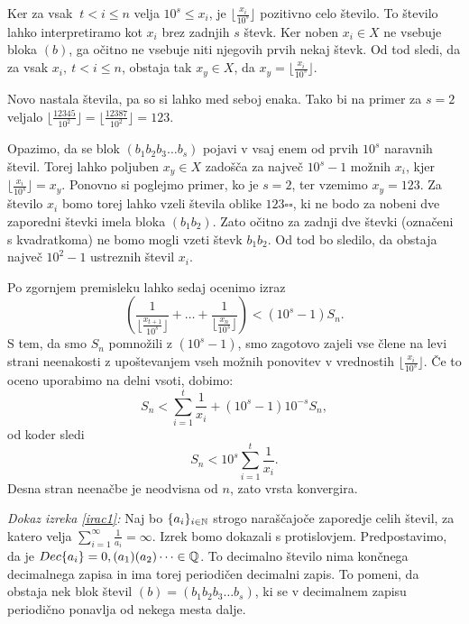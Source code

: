 \documentclass[twoside,11pt]{article}
\begin{document}
Ker za vsak $\ t < i \leq n$ velja $10^s \leq x_i$, je $\lfloor \frac{x_i}{10^s} \rfloor$ pozitivno celo število.
To število lahko interpretiramo kot $x_i$ brez zadnjih $s$ števk. 
Ker noben $x_i \in X$ ne vsebuje bloka $(b)$, 
ga očitno ne vsebuje niti njegovih prvih nekaj števk. 
Od tod sledi, da za vsak $x_i, \ t < i \leq n$, obstaja tak $x_y \in X$, da $ x_y = \lfloor \frac{x_i}{10^s} \rfloor$.

Novo nastala števila, pa so si lahko med seboj enaka. Tako bi na primer za $s=2$ veljalo 
$ \lfloor\frac{12345}{10^2}\rfloor = \lfloor \frac{12387}{10^2}\rfloor = 123$.

Opazimo, da se blok $(b_1b_2b_3 \dots b_s)$ pojavi v vsaj enem od prvih $10^s$ naravnih števil.
Torej lahko poljuben $x_y \in X$ zadošča za največ $10^s - 1$ možnih $x_i$, kjer $\lfloor \frac{x_i}{10^s} \rfloor = x_y$.
%
Ponovno si poglejmo primer, ko je $s=2$, ter vzemimo $x_y = 123$. Za število $x_i$ bomo torej lahko vzeli števila oblike $123 \square \square$,
ki ne bodo za nobeni dve zaporedni števki imela bloka $(b_1b_2)$. 
Zato očitno za zadnji dve števki (označeni s kvadratkoma) ne bomo mogli vzeti števk $b_1b_2$. 
Od tod bo sledilo, da obstaja največ $10^2 - 1$ ustreznih števil $x_i$.

Po zgornjem premisleku lahko sedaj ocenimo izraz 
\[(\frac{1}{ \lfloor\frac{x_{t + 1}}{10^s}\rfloor} + \dots + \frac{1}{\lfloor\frac{x_n}{10^s}\rfloor}) < (10^s - 1)S_n.\]
S tem, da smo $S_n$ pomnožili z $(10^s - 1)$, smo zagotovo zajeli vse člene na levi strani neenakosti
z upoštevanjem vseh možnih ponovitev v vrednostih $\lfloor\frac{x_i}{10^s}\rfloor$.
Če to oceno uporabimo na delni vsoti, dobimo:
\[
    S_n < \sum_{i=1}^t \frac{1}{x_i} + (10^s - 1)10^{-s}S_n,
\] 
od koder sledi
\[
    S_n < 10^s \sum_{i=1}^t \frac{1}{x_i}.
\]
Desna stran neenačbe je neodvisna od $n$, zato vrsta konvergira.

\QED

\noindent
{\em Dokaz izreka \ref{irac1}:\/} Naj bo $\{a_i\}_{i\in \mathbb{N}}$ strogo naraščajoče zaporedje
celih števil, za katero velja $\sum_{i=1}^{\infty}\frac{1}{a_i} = \infty$. Izrek bomo dokazali
s protislovjem. Predpostavimo, da je $Dec\{a_i\} = 0,(a_1)(a_2) \dots \in \mathbb{Q}$. 
To decimalno
število nima končnega decimalnega zapisa in ima torej periodičen decimalni zapis.
To pomeni, da obstaja nek blok števil $(b) = (b_1b_2b_3 \dots b_s)$,
ki se v decimalnem zapisu periodično ponavlja od nekega mesta dalje. 
\end{document}
